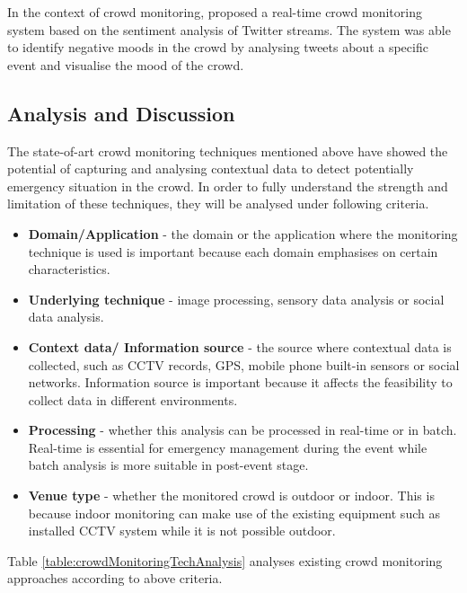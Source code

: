 In the context of crowd monitoring, \citet{DelirHaghighi2013} proposed a real-time crowd monitoring system based on the sentiment analysis of Twitter streams. The system was able to identify negative moods in the crowd by analysing tweets about a specific event and visualise the mood of the crowd.

\subsection{Analysis and Discussion}
The state-of-art crowd monitoring techniques mentioned above have showed the potential of capturing and analysing contextual data to detect potentially emergency situation in the crowd. In order to fully understand the strength and limitation of these techniques, they will be analysed under following criteria.

\begin{itemize}
	\item \textbf{Domain/Application} - the domain or the application where the monitoring technique is used is important because each domain emphasises on certain characteristics. 
	\item \textbf{Underlying technique} - image processing, sensory data analysis or social data analysis.
	\item \textbf{Context data/ Information source} - the source where contextual data is collected, such as CCTV records, GPS, mobile phone built-in sensors or social networks. Information source is important because it affects the feasibility to collect data in different environments.
	\item \textbf{Processing} - whether this analysis can be processed in real-time or in batch. Real-time is essential for emergency management during the event while batch analysis is more suitable in post-event stage.
	\item \textbf{Venue type} - whether the monitored crowd is outdoor or indoor. This is because indoor monitoring can make use of the existing equipment such as installed CCTV system while it is not possible outdoor.
\end{itemize}

Table \ref{table:crowdMonitoringTechAnalysis} analyses existing crowd monitoring approaches according to above criteria.

